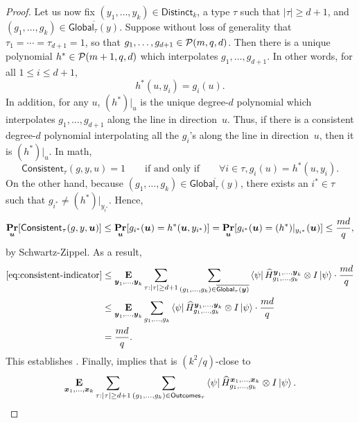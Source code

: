 \begin{proof}
Let us now fix $(y_1, \ldots, y_k) \in \mathsf{Distinct}_k$,
a type $\tau$ such that $|\tau| \geq d+1$,
and $(g_1, \ldots, g_k) \in \overline{\mathsf{Global}_{\tau}(y)}$.
Suppose without loss of generality that $\tau_1 = \cdots = \tau_{d+1} = 1$,
so that $g_1, \ldots, g_{d+1} \in \mathcal{P}(m, q, d)$.
Then there is a unique polynomial $h^* \in \mathcal{P}(m+1, q, d)$ which interpolates $g_1, \ldots, g_{d+1}$.
In other words, for all $1 \leq i \leq d+1$,
\begin{equation*}
h^*(u, y_i) = g_i(u).
\end{equation*}
In addition, for any $u$, 
$(h^*)|_u$ is the unique degree-$d$ polynomial
which interpolates $g_1, \ldots, g_{d+1}$ along the line in direction~$u$.
Thus, if there is a consistent degree-$d$ polynomial interpolating all the $g_i$'s along the line in direction~$u$,
then it is $(h^*)|_u$.
In math,
\begin{equation*}
\mathsf{Consistent}_{\tau}(g, y,u) = 1
\qquad \text{if and only if} \qquad
\forall i \in \tau, g_i(u) = h^*(u, y_i).
\end{equation*}
On the other hand, because $(g_1, \ldots, g_k) \in \overline{\mathsf{Global}_{\tau}(y)}$, 
there exists an $i^* \in \tau$ such that $g_{i^*} \neq (h^*)|_{y_{i^*}}$.
Hence,
\begin{equation*}
\mathop{\bf Pr\/}_{\boldsymbol{u}}[\mathsf{Consistent}_{\tau}(g, y,\boldsymbol{u})]
\leq \mathop{\bf Pr\/}_{\boldsymbol{u}}[g_{i^*}(\boldsymbol{u}) = h^*(\boldsymbol{u}, y_{i^*})]
= \mathop{\bf Pr\/}_{\boldsymbol{u}}[g_{i^*}(\boldsymbol{u}) = (h^*)|_{y_{i^*}}(\boldsymbol{u})]
\leq \frac{md}{q},
\end{equation*}
by Schwartz-Zippel.
As a result,
\begin{align*}
\eqref{eq:consistent-indicator}
& \leq 
 \mathop{\bf E\/}_{\boldsymbol{y}_1, \ldots, \boldsymbol{y}_k}   \sum_{\tau:|\tau|\geq d+1} \sum_{(g_1, \ldots, g_k) \in \overline{\mathsf{Global}_{\tau}(\boldsymbol{y})}} \bra{\psi} \widehat{H}^{\boldsymbol{y}_1, \ldots, \boldsymbol{y}_k}_{g_1, \ldots, g_k} \otimes I \ket{\psi} \cdot \frac{md}{q}\\
 &\leq
  \mathop{\bf E\/}_{\boldsymbol{y}_1, \ldots, \boldsymbol{y}_k}   \sum_{g_1, \ldots, g_k} \bra{\psi} \widehat{H}^{\boldsymbol{y}_1, \ldots, \boldsymbol{y}_k}_{g_1, \ldots, g_k} \otimes I \ket{\psi} \cdot \frac{md}{q}\\
  & = \frac{md}{q}.
\end{align*}
This establishes .
Finally,  implies that  is $(k^2/q)$-close to
\begin{equation*}
\E_{\bx_1, \ldots, \bx_k}  \sum_{\tau:|\tau| \geq d+1} \sum_{(g_1, \ldots, g_k) \in \mathsf{Outcomes}_{\tau}} \bra{\psi} \widehat{H}^{\bx_1, \ldots, \bx_k}_{g_1, \ldots, g_k} \otimes I \ket{\psi}.

\end{equation*}
\end{proof}
